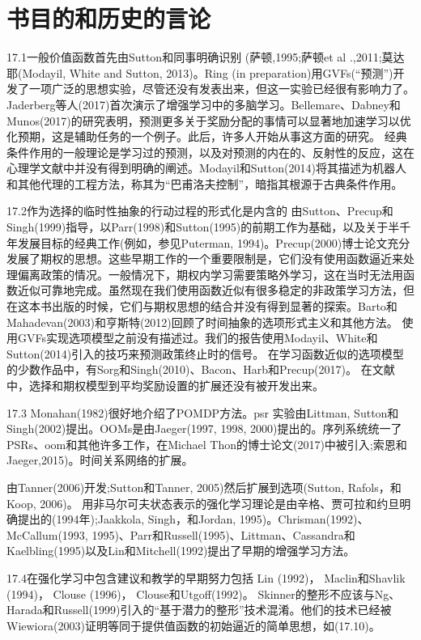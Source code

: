 \section{书目的和历史的言论}

17.1一般价值函数首先由Sutton和同事明确识别
(萨顿,1995;萨顿et al .,2011;莫达耶(Modayil, White and Sutton, 2013)。Ring (in preparation)用GVFs(“预测”)开发了一项广泛的思想实验，尽管还没有发表出来，但这一实验已经很有影响力了。
Jaderberg等人(2017)首次演示了增强学习中的多脑学习。Bellemare、Dabney和Munos(2017)的研究表明，预测更多关于奖励分配的事情可以显著地加速学习以优化预期，这是辅助任务的一个例子。此后，许多人开始从事这方面的研究。
经典条件作用的一般理论是学习过的预测，以及对预测的内在的、反射性的反应，这在心理学文献中并没有得到明确的阐述。Modayil和Sutton(2014)将其描述为机器人和其他代理的工程方法，称其为“巴甫洛夫控制”，暗指其根源于古典条件作用。

17.2作为选择的临时性抽象的行动过程的形式化是内含的
由Sutton、Precup和Singh(1999)指导，以Parr(1998)和Sutton(1995)的前期工作为基础，以及关于半千年发展目标的经典工作(例如，参见Puterman, 1994)。Precup(2000)博士论文充分发展了期权的思想。这些早期工作的一个重要限制是，它们没有使用函数逼近来处理偏离政策的情况。一般情况下，期权内学习需要策略外学习，这在当时无法用函数近似可靠地完成。虽然现在我们使用函数近似有很多稳定的非政策学习方法，但在这本书出版的时候，它们与期权思想的结合并没有得到显著的探索。Barto和Mahadevan(2003)和亨斯特(2012)回顾了时间抽象的选项形式主义和其他方法。
使用GVFs实现选项模型之前没有描述过。我们的报告使用Modayil、White和Sutton(2014)引入的技巧来预测政策终止时的信号。
在学习函数近似的选项模型的少数作品中，有Sorg和Singh(2010)、Bacon、Harb和Precup(2017)。
在文献中，选择和期权模型到平均奖励设置的扩展还没有被开发出来。

17.3 Monahan(1982)很好地介绍了POMDP方法。psr
实验由Littman, Sutton和Singh(2002)提出。OOMs是由Jaeger(1997, 1998, 2000)提出的。序列系统统一了PSRs、oom和其他许多工作，在Michael Thon的博士论文(2017)中被引入;索恩和Jaeger,2015)。时间关系网络的扩展。


由Tanner(2006)开发;Sutton和Tanner, 2005)然后扩展到选项(Sutton, Rafols，和Koop, 2006)。
用非马尔可夫状态表示的强化学习理论是由辛格、贾可拉和约旦明确提出的(1994年);Jaakkola, Singh，和Jordan, 1995)。Chrisman(1992)、McCallum(1993, 1995)、Parr和Russell(1995)、Littman、Cassandra和Kaelbling(1995)以及Lin和Mitchell(1992)提出了早期的增强学习方法。

17.4在强化学习中包含建议和教学的早期努力包括
Lin (1992)， Maclin和Shavlik (1994)， Clouse (1996)， Clouse和Utgoff(1992)。
Skinner的整形不应该与Ng、Harada和Russell(1999)引入的“基于潜力的整形”技术混淆。他们的技术已经被Wiewiora(2003)证明等同于提供值函数的初始逼近的简单思想，如(17.10)。

